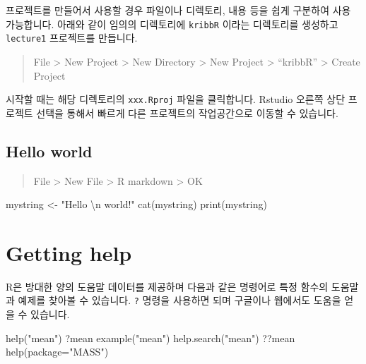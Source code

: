 \documentclass[
]{book}
\newenvironment{Shaded}{\begin{snugshade}}{\end{snugshade}}
\newcommand{\AttributeTok}[1]{\textcolor[rgb]{0.77,0.63,0.00}{#1}}
\newcommand{\FunctionTok}[1]{\textcolor[rgb]{0.00,0.00,0.00}{#1}}
\newcommand{\NormalTok}[1]{#1}
\newcommand{\OtherTok}[1]{\textcolor[rgb]{0.56,0.35,0.01}{#1}}
\newcommand{\SpecialCharTok}[1]{\textcolor[rgb]{0.00,0.00,0.00}{#1}}
\newcommand{\StringTok}[1]{\textcolor[rgb]{0.31,0.60,0.02}{#1}}
\begin{document}
프로젝트를 만들어서 사용할 경우 파일이나 디렉토리, 내용 등을 쉽게 구분하여 사용 가능합니다. 아래와 같이 임의의 디렉토리에 \texttt{kribbR} 이라는 디렉토리를 생성하고 \texttt{lecture1} 프로젝트를 만듭니다.

\begin{quote}
File \textgreater{} New Project \textgreater{} New Directory \textgreater{} New Project \textgreater{} ``kribbR'' \textgreater{} Create Project
\end{quote}

시작할 때는 해당 디렉토리의 \texttt{xxx.Rproj} 파일을 클릭합니다. Rstudio 오른쪽 상단 프로젝트 선택을 통해서 빠르게 다른 프로젝트의 작업공간으로 이동할 수 있습니다.

\hypertarget{hello-world}{%
\subsection{Hello world}\label{hello-world}}

\begin{quote}
File \textgreater{} New File \textgreater{} R markdown \textgreater{} OK
\end{quote}

\begin{Shaded}
\begin{Highlighting}[]
\NormalTok{mystring }\OtherTok{\textless{}{-}} \StringTok{"Hello }\SpecialCharTok{\textbackslash{}n}\StringTok{ world!"}
\FunctionTok{cat}\NormalTok{(mystring)}
\FunctionTok{print}\NormalTok{(mystring)}
\end{Highlighting}
\end{Shaded}

\hypertarget{getting-help}{%
\section{Getting help}\label{getting-help}}

R은 방대한 양의 도움말 데이터를 제공하며 다음과 같은 명령어로 특정 함수의 도움말과 예제를 찾아볼 수 있습니다. \texttt{?} 명령을 사용하면 되며 구글이나 웹에서도 도움을 얻을 수 있습니다.

\begin{Shaded}
\begin{Highlighting}[]
\FunctionTok{help}\NormalTok{(}\StringTok{"mean"}\NormalTok{)}
\NormalTok{?mean}
\FunctionTok{example}\NormalTok{(}\StringTok{"mean"}\NormalTok{)}
\FunctionTok{help.search}\NormalTok{(}\StringTok{"mean"}\NormalTok{)}
\NormalTok{??mean}
\FunctionTok{help}\NormalTok{(}\AttributeTok{package=}\StringTok{"MASS"}\NormalTok{)}
\end{Highlighting}
\end{Shaded}
\end{document}

